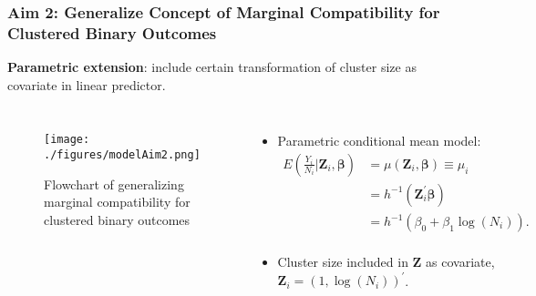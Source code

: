 \documentclass[hyperref={bookmarks=false},aspectratio=169]{beamer}
\begin{document}
\begin{frame}
\frametitle{Aim 2: Generalize Concept of Marginal Compatibility for Clustered Binary Outcomes}

\textbf{Parametric extension}: include certain transformation of cluster size as covariate in linear predictor.

\begin{columns}


\begin{figure}
    \centering
    \texttt{[image: ./figures/modelAim2.png]}
    \caption{Flowchart of generalizing marginal compatibility for clustered binary outcomes}
    \label{fig:Aim21}
\end{figure}

\begin{itemize}
    \item \alert{Parametric conditional mean model}:
    \begin{equation*}\label{M:parametricSPGLM_GMCconditionalMean}
    \begin{split}
    E\left( \frac{Y_i}{N_i} | \boldsymbol{Z}_i, \boldsymbol{\beta} \right) &= \mu(\boldsymbol{Z}_i, \boldsymbol{\beta})  \equiv \mu_i  \\
    &= h^{-1} \left( \boldsymbol{Z}_i^{'} \boldsymbol{\beta} \right) \\
    &= h^{-1} \left( \beta_0 + \beta_1 \log(N_i) \right) . \\
    \end{split}
    \end{equation*}
    \item Cluster size included in $\boldsymbol{Z}$ as covariate, $\boldsymbol{Z}_i = \left( 1, \log(N_i) \right)^{'}$.
\end{itemize}

\end{columns}
\end{frame}
\end{document}
